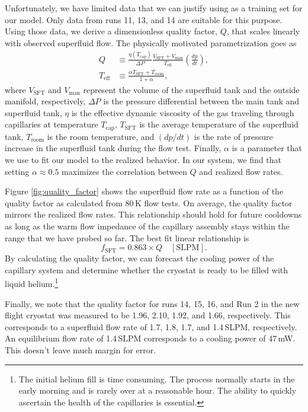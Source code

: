 \documentclass[
12pt, %
letterpaper, %
oneside, %
headinclude, footinclude, %
BCOR5mm, %
]{scrartcl}
\newcommand{\mrm}[1]{\mathrm{#1}}
\begin{document}
Unfortunately, we have limited data that we can justify using as a training set for our model. Only data from runs 11, 13, and 14 are suitable for this purpose. Using those data, we derive a dimensionless quality factor, $Q$, that scales linearly with observed superfluid flow. The physically motivated parametrization goes as
\begin{align}
Q &\equiv \frac{\eta (T_\mrm{cap})}{\Delta P} \frac{V_\mrm{SFT}+V_\mrm{man}}{T_\mrm{eff}} \left( \frac{d p}{d t} \right), \\
T_\mrm{eff} &\equiv \frac{\alpha T_\mrm{SFT}+T_\mrm{room}}{1+\alpha},
\end{align}
where $V_\mrm{SFT}$ and $V_\mrm{man}$ represent the volume of the superfluid tank and the outside manifold, respectively, $\Delta P$ is the pressure differential between the main tank and superfluid tank, $\eta$ is the effective dynamic viscosity of the gas traveling through capillaries at temperature $T_\mrm{cap}$, $T_\mrm{SFT}$ is the average temperature of the superfluid tank, $T_\mrm{room}$ is the room temperature, and $(d p/d t)$ is the rate of pressure increase in the superfluid tank during the flow test. Finally, $\alpha$ is a parameter that we use to fit our model to the realized behavior. In our system, we find that setting $\alpha \approx 0.5$ maximizes the correlation between $Q$ and realized flow rates.

Figure \ref{fig:quality_factor} shows the superfluid flow rate as a function of the quality factor as calculated from 80\,K flow tests. On average, the quality factor mirrors the realized flow rates. This relationship should hold for future cooldowns as long as the warm flow impedance of the capillary assembly stays within the range that we have probed so far. The best fit linear relationship is 
\begin{equation}
f_\mrm{SFT} = 0.863 \times Q \quad [\mrm{SLPM}].
\end{equation}
By calculating the quality factor, we can forecast the cooling power of the capillary system and determine whether the cryostat is ready to be filled with liquid helium.\footnote{The initial helium fill is time consuming. The process normally starts in the early morning and is rarely over at a reasonable hour. The ability to quickly ascertain the health of the capillaries is essential.}

Finally, we note that the quality factor for runs 14, 15, 16, and Run 2 in the new flight cryostat was measured to be 1.96, 2.10, 1.92, and 1.66, respectively. This corresponds to a superfluid flow rate of 1.7, 1.8, 1.7, and 1.4\,SLPM, respectively. An equilibrium flow rate of 1.4\,SLPM corresponds to a cooling power of 47\,mW. This doesn't leave much margin for error.
\end{document}
